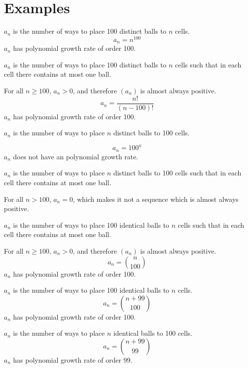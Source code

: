 \documentclass[00_complete]{subfiles}
\begin{document}
\section{Examples}
\begin{example}
    $a_n$ is the number of ways to place 100 distinct balls to $n$ cells.
    $$a_n=n^{100}$$
    $a_n$ has polynomial growth rate of order 100.
\end{example}
\begin{example}
    $a_n$ is the number of ways to place 100 distinct balls to $n$ cells such
    that in each cell there contains at most one ball.

    For all $n \geq 100$, $a_n>0$, and therefore $(a_n)$ is almost always
    positive.
    $$a_n=\frac{n!}{(n-100)!}$$
    $a_n$ has polynomial growth rate of order 100.
\end{example}
\begin{example}
    $a_n$ is the number of ways to place $n$ distinct balls to 100 cells.

    $$a_n=100^n$$
    $a_n$ does not have an polynomial growth rate.
\end{example}
\begin{example}
    $a_n$ is the number of ways to place $n$ distinct balls to 100 cells such
    that in each cell there contains at most one ball.

    For all $n > 100$, $a_n=0$, which makes it not a sequence which is
    almost always positive.
\end{example}
\begin{example}
    $a_n$ is the number of ways to place 100 identical balls to $n$ cells such
    that in each cell there contains at most one ball.

    For all $n \geq 100$, $a_n>0$, and therefore $(a_n)$ is almost always
    positive.
    $$a_n=\binom{n}{100}$$
    $a_n$ has polynomial growth rate of order 100.
\end{example}
\begin{example}
    $a_n$ is the number of ways to place 100 identical balls to $n$ cells.
    $$a_n=\binom{n+99}{100}$$
    $a_n$ has polynomial growth rate of order 100.
\end{example}
\begin{example}
    $a_n$ is the number of ways to place $n$ identical balls to 100 cells.
    $$a_n=\binom{n+99}{99}$$
    $a_n$ has polynomial growth rate of order 99.
\end{example}
\end{document}
